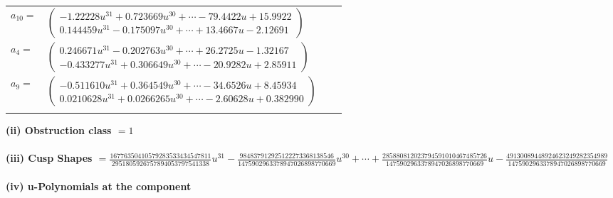 \documentclass[1p]{elsarticle_modified}
\theoremstyle{definition}
\begin{document}
\begin{tabular}{m{7pt} m{180pt} m{7pt} m{180pt} }
\flushright $a_{10}=$&$\begin{pmatrix}-1.22228 u^{31}+0.723669 u^{30}+\cdots-79.4422 u+15.9922\\0.144459 u^{31}-0.175097 u^{30}+\cdots+13.4667 u-2.12691\end{pmatrix}$ \\
\flushright $a_{4}=$&$\begin{pmatrix}0.246671 u^{31}-0.202763 u^{30}+\cdots+26.2725 u-1.32167\\-0.433277 u^{31}+0.306649 u^{30}+\cdots-20.9282 u+2.85911\end{pmatrix}$ \\
\flushright $a_{9}=$&$\begin{pmatrix}-0.511610 u^{31}+0.364549 u^{30}+\cdots-34.6526 u+8.45934\\0.0210628 u^{31}+0.0266265 u^{30}+\cdots-2.60628 u+0.382990\end{pmatrix}$\\&\end{tabular}
\flushleft \textbf{(ii) Obstruction class $= 1$}\\~\\
\flushleft \textbf{(iii) Cusp Shapes $= \frac{16776350410579283533434547811}{2951805926757894053797541338} u^{31}-\frac{984837912925122273368138546}{1475902963378947026898770669} u^{30}+\cdots+\frac{285880812023794591010467485726}{1475902963378947026898770669} u-\frac{49130089448924623249282354989}{1475902963378947026898770669}$}\\~\\
\newpage\renewcommand{\arraystretch}{1}
\flushleft \textbf{(iv) u-Polynomials at the component}\newline \\
\end{document}

